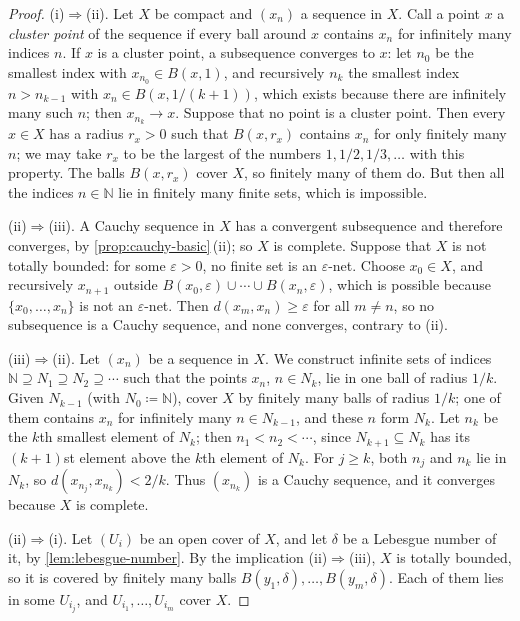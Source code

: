 \begin{proof}
(i)$\Rightarrow$(ii). Let $X$ be compact and $(x_n)$ a sequence in $X$. Call a point $x$ a \emph{cluster point} of the sequence if every ball around $x$ contains $x_n$ for infinitely many indices $n$. If $x$ is a cluster point, a subsequence converges to $x$: let $n_0$ be the smallest index with $x_{n_0}\in B(x,1)$, and recursively $n_k$ the smallest index $n>n_{k-1}$ with $x_n\in B(x,1/(k+1))$, which exists because there are infinitely many such $n$; then $x_{n_k}\to x$. Suppose that no point is a cluster point. Then every $x\in X$ has a radius $r_x>0$ such that $B(x,r_x)$ contains $x_n$ for only finitely many $n$; we may take $r_x$ to be the largest of the numbers $1,1/2,1/3,\ldots$ with this property. The balls $B(x,r_x)$ cover $X$, so finitely many of them do. But then all the indices $n\in\mathbb N$ lie in finitely many finite sets, which is impossible.

(ii)$\Rightarrow$(iii). A Cauchy sequence in $X$ has a convergent subsequence and therefore converges, by \cref{prop:cauchy-basic}\,(ii); so $X$ is complete. Suppose that $X$ is not totally bounded: for some $\varepsilon>0$, no finite set is an $\varepsilon$-net. Choose $x_0\in X$, and recursively $x_{n+1}$ outside $B(x_0,\varepsilon)\cup\cdots\cup B(x_n,\varepsilon)$, which is possible because $\{x_0,\ldots,x_n\}$ is not an $\varepsilon$-net. Then $d(x_m,x_n)\ge\varepsilon$ for all $m\ne n$, so no subsequence is a Cauchy sequence, and none converges, contrary to (ii).

(iii)$\Rightarrow$(ii). Let $(x_n)$ be a sequence in $X$. We construct infinite sets of indices $\mathbb N\supseteq N_1\supseteq N_2\supseteq\cdots$ such that the points $x_n$, $n\in N_k$, lie in one ball of radius $1/k$. Given $N_{k-1}$ (with $N_0\coloneqq\mathbb N$), cover $X$ by finitely many balls of radius $1/k$; one of them contains $x_n$ for infinitely many $n\in N_{k-1}$, and these $n$ form $N_k$. Let $n_k$ be the $k$th smallest element of $N_k$; then $n_1<n_2<\cdots$, since $N_{k+1}\subseteq N_k$ has its $(k+1)$st element above the $k$th element of $N_k$. For $j\ge k$, both $n_j$ and $n_k$ lie in $N_k$, so $d(x_{n_j},x_{n_k})<2/k$. Thus $(x_{n_k})$ is a Cauchy sequence, and it converges because $X$ is complete.

(ii)$\Rightarrow$(i). Let $(U_i)$ be an open cover of $X$, and let $\delta$ be a Lebesgue number of it, by \cref{lem:lebesgue-number}. By the implication (ii)$\Rightarrow$(iii), $X$ is totally bounded, so it is covered by finitely many balls $B(y_1,\delta),\ldots,B(y_m,\delta)$. Each of them lies in some $U_{i_j}$, and $U_{i_1},\ldots,U_{i_m}$ cover $X$.
\end{proof}

